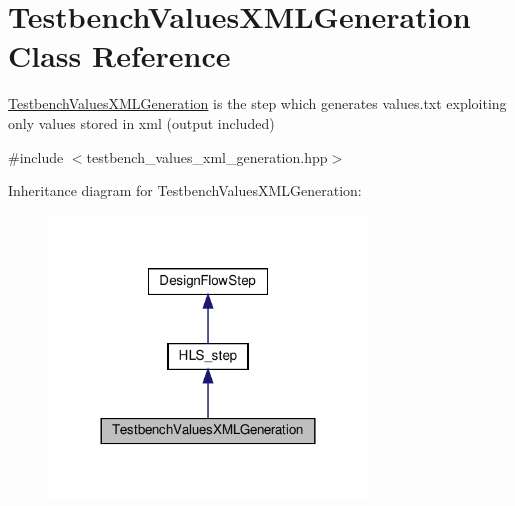 \hypertarget{classTestbenchValuesXMLGeneration}{}\section{Testbench\+Values\+X\+M\+L\+Generation Class Reference}
\label{classTestbenchValuesXMLGeneration}


\hyperlink{classTestbenchValuesXMLGeneration}{Testbench\+Values\+X\+M\+L\+Generation} is the step which generates values.\+txt exploiting only values stored in xml (output included)  




{\ttfamily \#include $<$testbench\+\_\+values\+\_\+xml\+\_\+generation.\+hpp$>$}



Inheritance diagram for Testbench\+Values\+X\+M\+L\+Generation\+:
\nopagebreak
\begin{figure}[H]
\begin{center}
\leavevmode
\includegraphics[width=240pt]{d0/d24/classTestbenchValuesXMLGeneration__inherit__graph}
\end{center}
\end{figure}


